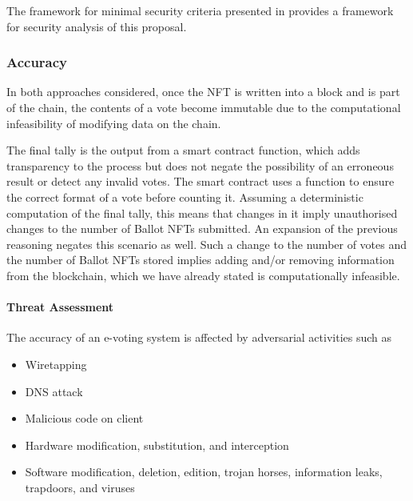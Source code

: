 \documentclass[../main.tex]{subfiles}
\begin{document}
The framework for minimal security criteria presented in \cite{Almeida2023} provides a framework for security analysis of this proposal.

\subsubsection{Accuracy}
In both approaches considered, once the NFT is written into a block and is part of the chain, the contents of a vote become immutable due to the computational infeasibility of modifying data on the chain.
\par
The final tally is the output from a smart contract function, which adds transparency to the process but does not negate the possibility of an erroneous result or detect any invalid votes. The smart contract uses a function to ensure the correct format of a vote before counting it. Assuming a deterministic computation of the final tally, this means that changes in it imply unauthorised changes to the number of Ballot NFTs submitted. An expansion of the previous reasoning negates this scenario as well. Such a change to the number of votes and the number of Ballot NFTs stored implies adding and/or removing information from the blockchain, which we have already stated is computationally infeasible.

\paragraph{Threat Assessment}
The accuracy of an e-voting system is affected by adversarial activities such as
\begin{itemize}

    \item{Wiretapping}

    \item{DNS attack}

    \item{Malicious code on client}

    \item{Hardware modification, substitution, and interception}

    \item{Software modification, deletion, edition, trojan horses, information leaks, trapdoors, and viruses}

\end{itemize}
\end{document}

